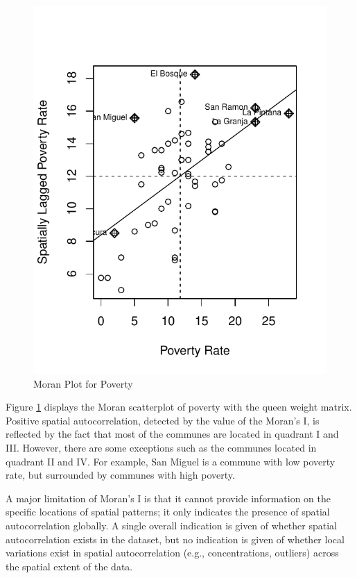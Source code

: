 \documentclass[english,12pt]{book}\usepackage[]{graphicx}\usepackage[]{xcolor}
\makeatletter
\def\maxwidth{ %
  \ifdim\Gin@nat@width>\linewidth
    \linewidth
  \else
    \Gin@nat@width
  \fi
}
\newenvironment{knitrout}{}{} %
\makeatother
\begin{document}
\begin{figure}[ht]
\caption{Moran Plot for Poverty}\label{fig:mp-poverty}
\begin{knitrout}
\color{fgcolor}

{\centering \includegraphics[width=\maxwidth]{figure/moran-plotT-1} 

}


\end{knitrout}
\end{figure}

Figure \ref{fig:mp-poverty} displays the Moran scatterplot of poverty with the queen weight matrix. Positive spatial autocorrelation, detected by the value of the Moran's I, is reflected by the fact that most of the communes are located in quadrant I and III. However, there are some exceptions such as the communes located in quadrant II and IV. For example, San Miguel is a commune with low poverty rate, but surrounded by communes with high poverty.  

A major limitation of Moran's I is that it cannot provide information on the specific locations of spatial patterns; it only indicates the presence of spatial autocorrelation globally. A single overall indication is given of whether spatial autocorrelation exists in the dataset, but no indication is given of whether local variations exist in spatial autocorrelation (e.g., concentrations, outliers) across the spatial extent of the data. 
\end{document}
